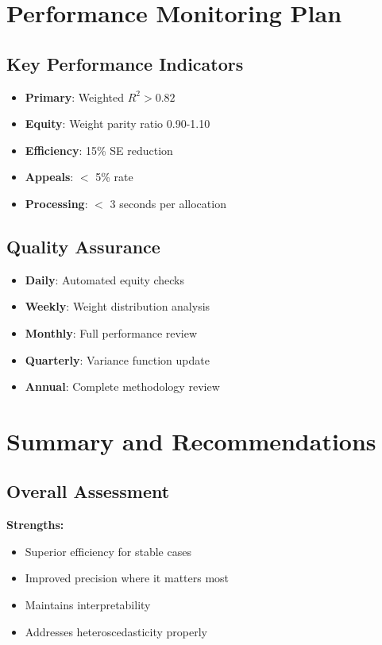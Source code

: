 \section{Performance Monitoring Plan}

\subsection{Key Performance Indicators}

\begin{itemize}
    \item \textbf{Primary}: Weighted $R^2 > 0.82$
    \item \textbf{Equity}: Weight parity ratio 0.90-1.10
    \item \textbf{Efficiency}: 15\% SE reduction
    \item \textbf{Appeals}: $<$ 5\% rate
    \item \textbf{Processing}: $<$ 3 seconds per allocation
\end{itemize}

\subsection{Quality Assurance}

\begin{itemize}
    \item \textbf{Daily}: Automated equity checks
    \item \textbf{Weekly}: Weight distribution analysis
    \item \textbf{Monthly}: Full performance review
    \item \textbf{Quarterly}: Variance function update
    \item \textbf{Annual}: Complete methodology review
\end{itemize}

\section{Summary and Recommendations}

\subsection{Overall Assessment}

\textbf{Strengths:}
\begin{itemize}
    \item Superior efficiency for stable cases
    \item Improved precision where it matters most
    \item Maintains interpretability
    \item Addresses heteroscedasticity properly
\end{itemize}

